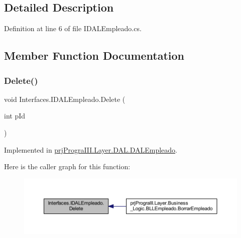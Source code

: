 \subsection{Detailed Description}


Definition at line 6 of file I\+D\+A\+L\+Empleado.\+cs.



\subsection{Member Function Documentation}
\hypertarget{interface_interfaces_1_1_i_d_a_l_empleado_a0e852e403321a652e418e8e09a94981d}{}\label{interface_interfaces_1_1_i_d_a_l_empleado_a0e852e403321a652e418e8e09a94981d} 
\subsubsection{\texorpdfstring{Delete()}{Delete()}}
{\footnotesize\ttfamily void Interfaces.\+I\+D\+A\+L\+Empleado.\+Delete (\begin{DoxyParamCaption}\item[{int}]{p\+Id }\end{DoxyParamCaption})}



Implemented in \hyperlink{classprj_progra_i_i_i_1_1_layer_1_1_d_a_l_1_1_d_a_l_empleado_a85ce6a93aea851d43025d0ff443d7c3d}{prj\+Progra\+I\+I\+I.\+Layer.\+D\+A\+L.\+D\+A\+L\+Empleado}.

Here is the caller graph for this function\+:
\nopagebreak
\begin{figure}[H]
\begin{center}
\leavevmode
\includegraphics[width=350pt]{interface_interfaces_1_1_i_d_a_l_empleado_a0e852e403321a652e418e8e09a94981d_icgraph}
\end{center}
\end{figure}
\hypertarget{interface_interfaces_1_1_i_d_a_l_empleado_a3a30db206c173af0ed7b44cf21e1de5c}{}\label{interface_interfaces_1_1_i_d_a_l_empleado_a3a30db206c173af0ed7b44cf21e1de5c} 
